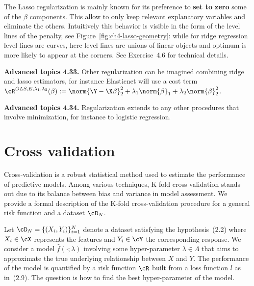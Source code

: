 \begin{remark}
The Lasso regularization is mainly known for its preference
to \textbf{set to zero} some of the $\beta$ components. This allow to only keep relevant
explanatory variables and eliminate the others. Intuitively this behavior is
visible in the form of the level lines of the penalty, see Figure~\ref{fig:ch4-lasso-geometry}: while
for ridge regression level lines are curves, here level lines are unions of
linear objects and optimum is more likely to appear at the corners. See
Exercise~4.6 for technical details.
\end{remark}

\begin{tcolorbox}[advancedbox]
\textbf{Advanced topics 4.33.} Other regularization can be imagined combining ridge and lasso estimators, for instance Elasticnet will use a cost
term $\cR^{OLS, E, \lambda_1, \lambda_2}(\beta) := \norm{\Y - \X \beta}_2^2 + \lambda_1 \norm{\beta}_1 + \lambda_2 \norm{\beta}_2^2$.
\end{tcolorbox}

\begin{tcolorbox}[advancedbox]
\textbf{Advanced topics 4.34.} Regularization extends to any other procedures
that involve minimization, for instance to logistic regression.
\end{tcolorbox}

\section{Cross validation}\label{sec:ch4-cv}

Cross-validation is a robust statistical method used to estimate the performance of predictive models. Among various techniques, K-fold cross-validation
stands out due to its balance between bias and variance in model assessment.
We provide a formal description of the K-fold cross-validation procedure for a
general risk function and a dataset $\cD_N$.

Let $\cD_N = \{(X_i, Y_i)\}_{i=1}^N$ denote a dataset satisfying the hypothesis~(2.2)
where $X_i \in \cX$ represents the features and $Y_i \in \cY$ the corresponding response.
We consider a model $\widehat{f}(\cdot; \lambda)$ involving some hyper-parameter $\lambda \in \Lambda$ that aims
to approximate the true underlying relationship between $X$ and $Y$. The performance of the model is quantified by a risk function $\cR$ built from a loss
function $l$ as in~(2.9). The question is how to find the best hyper-parameter
of the model.

